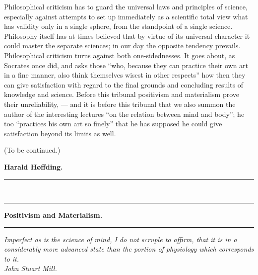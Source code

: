 \documentclass[12pt,a4paper,openany]{book}
\newcommand{\opage}[1]{\marginnote{\footnotesize\textit{[#1]}}}
\begin{document}
Philosophical criticism has to guard the universal
laws and principles of science, especially against attempts
to set up immediately as a scientific total view what
has validity only in a single sphere, from the standpoint of a single
science. Philosophy itself has at times
believed that by virtue of its universal character it could master
the separate sciences; in our day the opposite tendency
prevails. Philosophical criticism turns against both
one-sidednesses. It goes about, as Socrates once did,
and asks those ``who, because they can practice their own art
in a fine manner, also think themselves wisest in other
respects'' how then they can give satisfaction with regard
to the final grounds and concluding results of knowledge and science.
Before this tribunal positivism and
materialism prove their unreliability, --- and it is before this
tribunal that we also summon the author of the interesting
lectures ``on the relation between mind and body''; he too
``practices his own art so finely'' that he has supposed he could
give satisfaction beyond its limits as well.

\noindent\hspace*{1.5em}(To be continued.)\par
\begin{flushright}\textbf{Harald Høffding.}\end{flushright}
\begin{center}\rule{2.2cm}{0.4pt}\\[-10pt]\rule{2.2cm}{0.4pt}\end{center}

\clearpage
\opage{309}\begin{center}\textbf{\large Positivism and Materialism.}\end{center}

\begin{center}\rule{1.8cm}{0.4pt}\end{center}

\begin{flushright}\begin{minipage}{0.6\textwidth}\small\textit{Imperfect as is the science of mind, I do not scruple to affirm, that it is in a considerably more advanced state than the portion of physiology which corresponds to it.}\\ \hfill\textit{John Stuart Mill.}\end{minipage}\end{flushright}
\end{document}
